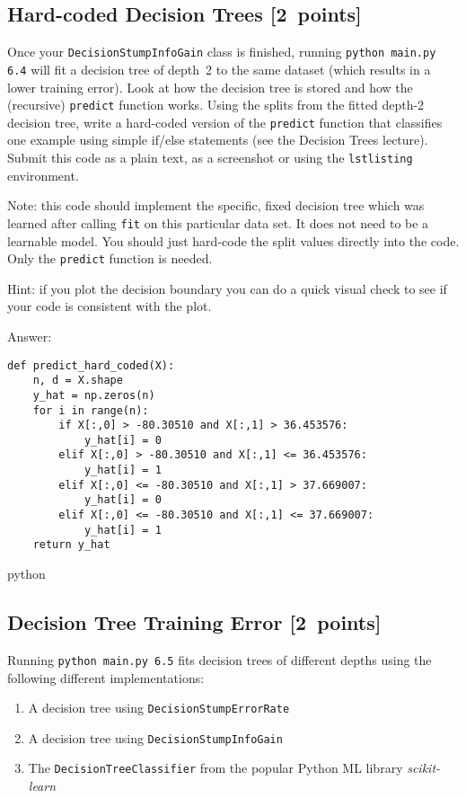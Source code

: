 \documentclass{article}
\newcommand{\blu}[1]{{\textcolor{blu}{#1}}}
\newenvironment{answer}{\par\begingroup\color{gre}Answer: }{\endgroup}
\let\ask\blu
\newcommand\pts[1]{\textcolor{pointscolour}{[#1~points]}}
\begin{document}
  \subsection{Hard-coded Decision Trees \pts{2}}

  Once your \texttt{DecisionStumpInfoGain} class is finished, running \texttt{python main.py 6.4} will fit
  a decision tree of depth~2 to the same dataset (which results in a lower training error).
  Look at how the decision tree is stored and how the (recursive) \texttt{predict} function works.
  \ask{Using the splits from the fitted depth-2 decision tree, write a hard-coded version of the \texttt{predict}
  function that classifies one example using simple if/else statements
  (see the Decision Trees lecture). Submit this code as a plain text, as a screenshot or using the \texttt{lstlisting} environment.}

  Note: this code should implement the specific, fixed decision tree
  which was learned after calling \texttt{fit} on this particular data set. It does not need to be a learnable model.
  You should just hard-code the split values directly into the code.
  Only the \texttt{predict} function is needed.

  Hint: if you plot the decision boundary you can do a quick visual check to see if your code is consistent with the plot.

    \begin{answer}
        \begin{verbatim}
def predict_hard_coded(X):
    n, d = X.shape
    y_hat = np.zeros(n)
    for i in range(n):
        if X[:,0] > -80.30510 and X[:,1] > 36.453576:
            y_hat[i] = 0
        elif X[:,0] > -80.30510 and X[:,1] <= 36.453576:
            y_hat[i] = 1
        elif X[:,0] <= -80.30510 and X[:,1] > 37.669007:
            y_hat[i] = 0
        elif X[:,0] <= -80.30510 and X[:,1] <= 37.669007:
            y_hat[i] = 1
    return y_hat
        \end{verbatim}{python}
    \end{answer}

  \subsection{Decision Tree Training Error \pts{2}}

  Running \texttt{python main.py 6.5} fits decision trees of different depths using the following different implementations:
  \begin{enumerate}
  \item A decision tree using \texttt{DecisionStumpErrorRate}
  \item A decision tree using \texttt{DecisionStumpInfoGain}
  \item The \texttt{DecisionTreeClassifier} from the popular Python ML library \emph{scikit-learn}
  \end{enumerate}
\end{document}

